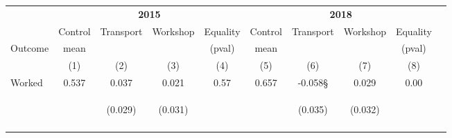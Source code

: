 \begin{tabular}{lccccccccc}
\hline \noalign{\smallskip} & \multicolumn{4}{c}{\textbf{2015}} & \multicolumn{4}{c}{\textbf{2018}} & \\
\cmidrule(lr){2-5}\cmidrule(lr){6-9} & Control & {Transport} & {Workshop} & {Equality} & Control & {Transport} & {Workshop} & {Equality} & \\
Outcome & mean &  &  & (pval) & mean &  &  & (pval) & \\
 & (1) & (2) & (3) & (4) & (5) & (6) & (7) & (8) & \\
\noalign{\smallskip}\hline \noalign{\smallskip}Worked & 0.537 & 0.037 & 0.021 & 0.57 & 0.657 & -0.058§ & 0.029 & 0.00 & \\
 & \begin{footnotesize}\end{footnotesize} & \begin{footnotesize}(0.029)\end{footnotesize} & \begin{footnotesize}(0.031)\end{footnotesize} & \begin{footnotesize}\end{footnotesize} & \begin{footnotesize}\end{footnotesize} & \begin{footnotesize}(0.035)\end{footnotesize} & \begin{footnotesize}(0.032)\end{footnotesize} & \begin{footnotesize}\end{footnotesize} & \begin{footnotesize}\end{footnotesize}\\
 & \begin{footnotesize}\end{footnotesize} & \begin{footnotesize}[0.366]\end{footnotesize} & \begin{footnotesize}[1.000]\end{footnotesize} & \begin{footnotesize}\end{footnotesize} & \begin{footnotesize}\end{footnotesize} & \begin{footnotesize}[0.411]\end{footnotesize} & \begin{footnotesize}[0.958]\end{footnotesize} & \begin{footnotesize}\end{footnotesize} & \begin{footnotesize}\end{footnotesize}\\

\end{tabular}
